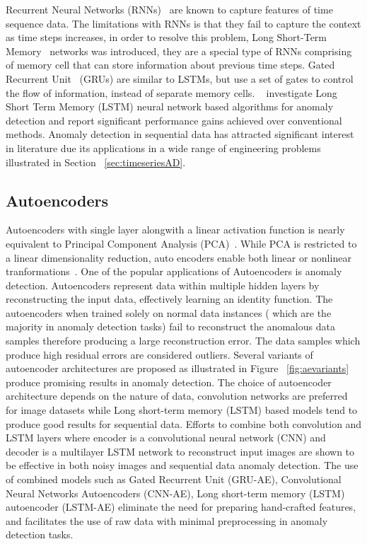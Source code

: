 Recurrent Neural Networks (RNNs)~\cite{williams1989complexity} are known to capture features of time sequence data. The limitations with RNNs is that they fail to capture the context as time steps increases, in order to resolve this problem,  Long Short-Term Memory~\cite{hochreiter1997long} networks was introduced, they  are a special type of RNNs comprising of memory cell that can store information about previous time steps. Gated Recurrent Unit~\cite{cho2014learning} (GRUs) are similar to LSTMs, but use a set of gates to control the flow of information, instead of separate memory cells. ~\cite{ergen2017unsupervised}
investigate Long Short Term Memory (LSTM) neural network based algorithms for anomaly detection and report significant performance gains achieved over conventional methods. Anomaly detection in sequential data  has attracted significant interest in literature due its applications in a wide range of engineering problems illustrated in Section ~\ref{sec:timeseriesAD}.

\subsection{Autoencoders}
\label{sec:ae}
Autoencoders with single layer alongwith a linear activation function is nearly equivalent to Principal Component Analysis (PCA)~\cite{pearson1901liii}. While PCA is restricted to a linear dimensionality reduction, auto encoders enable both linear or nonlinear tranformations~\cite{liou2008modeling,liou2014autoencoder}. One of the popular applications of Autoencoders is anomaly detection. Autoencoders represent data within multiple hidden layers by reconstructing the input data, effectively learning an identity function. The autoencoders when trained solely on normal data instances ( which are the majority in anomaly detection tasks) fail to reconstruct the anomalous data samples therefore producing a large reconstruction error. The data samples which produce high residual errors are considered outliers. Several variants of autoencoder architectures are proposed as illustrated in Figure ~\ref{fig:aevariants} produce promising results in anomaly detection. The choice of autoencoder architecture depends on the nature of data, convolution networks are preferred for image datasets while Long short-term memory (LSTM) based models tend to produce good results for sequential data. Efforts to combine both convolution and LSTM layers where encoder is a convolutional neural network (CNN) and decoder is a multilayer LSTM network to reconstruct  input images are shown to be effective in both noisy images and sequential data anomaly detection.  The use of combined models  such as Gated Recurrent Unit (GRU-AE), Convolutional Neural Networks Autoencoders (CNN-AE), Long short-term memory (LSTM) autoencoder (LSTM-AE) eliminate the need for preparing hand-crafted features,  and facilitates the use of raw data with minimal preprocessing in anomaly detection tasks.


